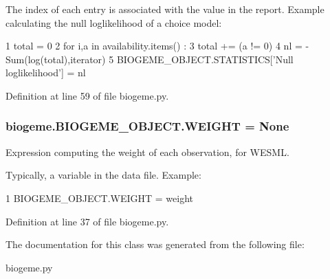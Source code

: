 The index of each entry is associated with the value in the report. Example calculating the null loglikelihood of a choice model\+: 
\begin{DoxyCode}
1 total = 0 
2 \textcolor{keywordflow}{for} i,a \textcolor{keywordflow}{in} availability.items() :
3     total += (a != 0)
4 nl = -Sum(log(total),iterator)
5 BIOGEME\_OBJECT.STATISTICS[\textcolor{stringliteral}{'Null loglikelihood'}] = nl
\end{DoxyCode}
 

Definition at line 59 of file biogeme.\+py.

\subsubsection[{\texorpdfstring{W\+E\+I\+G\+HT}{WEIGHT}}]{\setlength{\rightskip}{0pt plus 5cm}biogeme.\+B\+I\+O\+G\+E\+M\+E\+\_\+\+O\+B\+J\+E\+C\+T.\+W\+E\+I\+G\+HT = None\hspace{0.3cm}{\ttfamily [static]}}\hypertarget{classbiogeme_1_1_b_i_o_g_e_m_e___o_b_j_e_c_t_a2a9babe593d7115e3bfd57057ab9c97e}{}\label{classbiogeme_1_1_b_i_o_g_e_m_e___o_b_j_e_c_t_a2a9babe593d7115e3bfd57057ab9c97e}


Expression computing the weight of each observation, for W\+E\+S\+ML. 

Typically, a variable in the data file. Example\+:
\begin{DoxyCode}
1 BIOGEME\_OBJECT.WEIGHT = weight 
\end{DoxyCode}
 

Definition at line 37 of file biogeme.\+py.



The documentation for this class was generated from the following file\+:\begin{DoxyCompactItemize}
\item 
biogeme.\+py\end{DoxyCompactItemize}
